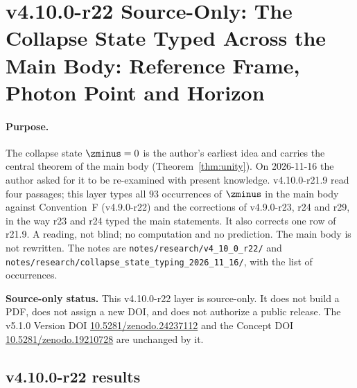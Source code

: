 
\clearpage
\section*{v4.10.0-r22 Source-Only: The Collapse State Typed Across the Main Body: Reference Frame, Photon Point and Horizon}
\label{sec:v4100-r22-collapse-state}

\paragraph{Purpose.}
The collapse state \(\zminus=0\) is the author's earliest idea and carries the central theorem of the main body
(Theorem~\ref{thm:unity}).  On 2026-11-16 the author asked for it to be re-examined with present knowledge.  v4.10.0-r21.9 read four
passages; this layer types all \(93\) occurrences of \(\zminus\) in the main body against Convention~F (v4.9.0-r22) and the
corrections of v4.9.0-r23, r24 and r29, in the way r23 and r24 typed the main statements.  It also corrects one row of r21.9.  A
reading, not blind; no computation and no prediction.  The main body is not rewritten.  The notes are
\texttt{notes/\allowbreak research/\allowbreak v4\_10\_0\_r22/} and
\texttt{notes/\allowbreak research/\allowbreak collapse\_state\_typing\_2026\_11\_16/}, with the list of occurrences.

\noindent\textbf{Source-only status.}
This v4.10.0-r22 layer is source-only.  It does not build a PDF, does not assign a new DOI,
and does not authorize a public release.  The v5.1.0 Version DOI
\href{https://doi.org/10.5281/zenodo.24237112}{10.5281/zenodo.24237112} and the Concept DOI
\href{https://doi.org/10.5281/zenodo.19210728}{10.5281/zenodo.19210728} are unchanged by it.

\subsection*{v4.10.0-r22 results}
\label{subsec:v4100-r22-results}

